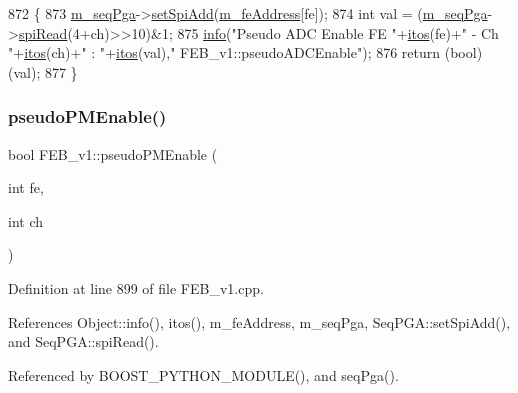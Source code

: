 \begin{DoxyCode}
872                                              \{
873   \hyperlink{classFEB__v1_a6c7804ac86796f233a8393043adf2e77}{m\_seqPga}->\hyperlink{classSeqPGA_ac998ce3a6d9b5f2e88cc8393f8c1df53}{setSpiAdd}(\hyperlink{classFEB__v1_a4e1945c2d5b434125f375e9d0fc6d99f}{m\_feAddress}[fe]);
874   \textcolor{keywordtype}{int} val = (\hyperlink{classFEB__v1_a6c7804ac86796f233a8393043adf2e77}{m\_seqPga}->\hyperlink{classSeqPGA_ab3d0e5e5d4014bc7a92588a76b8713d4}{spiRead}(4+ch)>>10)&1;
875   \hyperlink{classObject_a644fd329ea4cb85f54fa6846484b84a8}{info}(\textcolor{stringliteral}{"Pseudo ADC Enable FE "}+\hyperlink{Tools_8h_af330027dbdafb9a30768b3613c553e60}{itos}(fe)+\textcolor{stringliteral}{" - Ch "}+\hyperlink{Tools_8h_af330027dbdafb9a30768b3613c553e60}{itos}(ch)+\textcolor{stringliteral}{" : "}+\hyperlink{Tools_8h_af330027dbdafb9a30768b3613c553e60}{itos}(val),\textcolor{stringliteral}{"
      FEB\_v1::pseudoADCEnable"});
876   \textcolor{keywordflow}{return} (\textcolor{keywordtype}{bool})(val);
877 \}
\end{DoxyCode}
\mbox{\label{classFEB__v1_ab6b076d6e1372bfa8d9fd2916b1b52cd}} 
\subsubsection{\texorpdfstring{pseudo\+P\+M\+Enable()}{pseudoPMEnable()}}
{\footnotesize\ttfamily bool F\+E\+B\+\_\+v1\+::pseudo\+P\+M\+Enable (\begin{DoxyParamCaption}\item[{int}]{fe,  }\item[{int}]{ch }\end{DoxyParamCaption})}



Definition at line 899 of file F\+E\+B\+\_\+v1.\+cpp.



References Object\+::info(), itos(), m\+\_\+fe\+Address, m\+\_\+seq\+Pga, Seq\+P\+G\+A\+::set\+Spi\+Add(), and Seq\+P\+G\+A\+::spi\+Read().



Referenced by B\+O\+O\+S\+T\+\_\+\+P\+Y\+T\+H\+O\+N\+\_\+\+M\+O\+D\+U\+L\+E(), and seq\+Pga().


